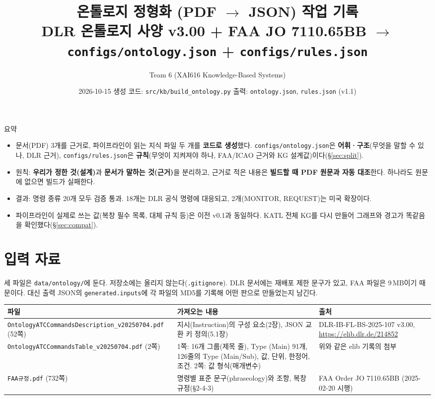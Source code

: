 \documentclass[10pt,a4paper]{article}
\title{\textbf{온톨로지 정형화 (PDF $\to$ JSON) 작업 기록}\\[3pt]\large DLR 온톨로지 사양 v3.00 + FAA JO 7110.65BB $\to$ \texttt{configs/ontology.json} + \texttt{configs/rules.json}}
\author{Team 6 \quad (XAI616 Knowledge-Based Systems)}
\date{2026-10-15 \quad 생성 코드: \texttt{src/kb/build\_ontology.py} \quad 출력: \texttt{ontology.json}, \texttt{rules.json} (v1.1)}
\newcommand{\cmd}[1]{\textsf{\small #1}}
\newcommand{\key}[1]{\texttt{\small #1}}
\begin{document}
\sloppy
\maketitle

\begin{note}{요약}
\begin{itemize}[leftmargin=12pt]
\item 문서(PDF) 3개를 근거로, 파이프라인이 읽는 지식 파일 두 개를 \textbf{코드로 생성}했다. \texttt{configs/ontology.json}은 \textbf{어휘·구조}(무엇을 말할 수 있나, DLR 근거), \texttt{configs/rules.json}은 \textbf{규칙}(무엇이 지켜져야 하나, FAA/ICAO 근거와 KG 설계값)이다(\S\ref{sec:split}).
\item 원칙: \textbf{우리가 정한 것(설계)}과 \textbf{문서가 말하는 것(근거)}을 분리하고, 근거로 적은 내용은 \textbf{빌드할 때 PDF 원문과 자동 대조}한다. 하나라도 원문에 없으면 빌드가 실패한다.
\item 결과: 명령 종류 20개 모두 검증 통과. 18개는 DLR 공식 명령에 대응되고, 2개(\cmd{MONITOR}, \cmd{REQUEST})는 미국 확장이다.
\item 파이프라인이 실제로 쓰는 값(복창 필수 목록, 대체 규칙 등)은 이전 v0.1과 동일하다. KATL 전체 KG를 다시 만들어 그래프와 경고가 똑같음을 확인했다(\S\ref{sec:compat}).
\end{itemize}
\end{note}

\tableofcontents

\section{입력 자료}
세 파일은 \texttt{data/ontology/}에 둔다. 저장소에는 올리지 않는다(\texttt{.gitignore}). DLR 문서에는 재배포 제한 문구가 있고, FAA 파일은 9\,MB이기 때문이다. 대신 출력 JSON의 \key{generated.inputs}에 각 파일의 MD5를 기록해 어떤 판으로 만들었는지 남긴다.

\begin{center}\small
\begin{tabularx}{\textwidth}{@{}>{\raggedright\arraybackslash}p{4.6cm}>{\raggedright\arraybackslash}X>{\raggedright\arraybackslash}p{3.0cm}@{}}
\toprule
파일 & 가져오는 내용 & 출처\\\midrule
\texttt{OntologyATCCommands\allowbreak Description\_v20250704.pdf} (52쪽) & 지시(Instruction)의 구성 요소(2장), JSON 교환 키 정의(5.1장) & DLR-IB-FL-BS-2025-107 v3.00, \url{https://elib.dlr.de/214852}\\
\texttt{OntologyATCCommands\allowbreak Table\_v20250704.pdf} (2쪽) & 1쪽: 16개 그룹(제목 줄), Type (Main) 91개, 126줄의 Type (Main/Sub), 값, 단위, 한정어, 조건. 2쪽: 값 형식(매개변수) & 위와 같은 elib 기록의 첨부\\
\texttt{FAA규정.pdf} (732쪽) & 명령별 표준 문구(phraseology)와 조항, 복창 규정(§2-4-3) & FAA Order JO 7110.65BB (2025-02-20 시행)\\
\bottomrule
\end{tabularx}
\end{center}
\end{document}

